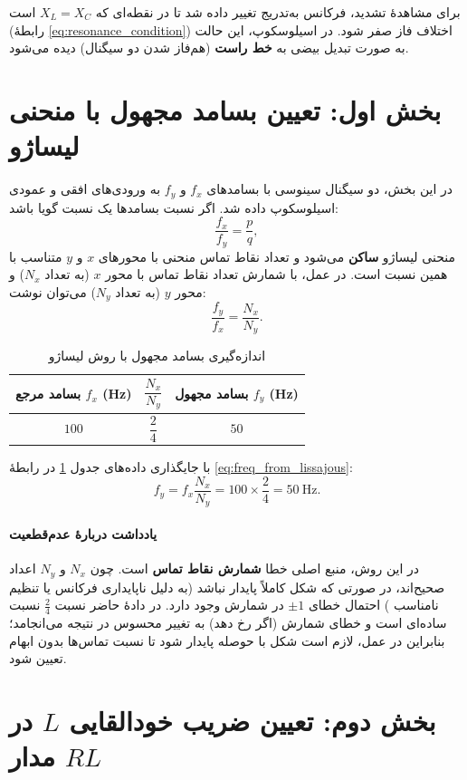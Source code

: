 \documentclass[a4paper, 11pt]{article}
\begin{document}
برای مشاهدهٔ تشدید، فرکانس به‌تدریج تغییر داده شد تا در نقطه‌ای که \(X_L=X_C\) است (رابطهٔ \eqref{eq:resonance_condition}) اختلاف فاز صفر شود. در اسیلوسکوپ، این حالت به صورت تبدیل بیضی به \textbf{خط راست} (هم‌فاز شدن دو سیگنال) دیده می‌شود.

\section{بخش اول: تعیین بسامد مجهول با منحنی لیساژو}

در این بخش، دو سیگنال سینوسی با بسامدهای \(f_x\) و \(f_y\) به ورودی‌های افقی و عمودی اسیلوسکوپ داده شد. اگر نسبت بسامدها یک نسبت گویا باشد:
\[
\frac{f_x}{f_y}=\frac{p}{q},
\]
منحنی لیساژو \textbf{ساکن} می‌شود و تعداد نقاط تماس منحنی با محورهای \(x\) و \(y\) متناسب با همین نسبت است. در عمل، با شمارش تعداد نقاط تماس با محور \(x\) (به تعداد \(N_x\)) و محور \(y\) (به تعداد \(N_y\)) می‌توان نوشت:
\begin{equation}
\frac{f_y}{f_x}=\frac{N_x}{N_y}.
\label{eq:freq_from_lissajous}
\end{equation}

\begin{table}[h!]
\caption{اندازه‌گیری بسامد مجهول با روش لیساژو}
\label{tab:freq_unknown}
\centering
\begin{tabular}{ccc}
\toprule
بسامد مرجع \(f_x\) (Hz) & \(\dfrac{N_x}{N_y}\) & بسامد مجهول \(f_y\) (Hz)\\
\midrule
$100$ & $\dfrac{2}{4}$ & $50$ \\
\bottomrule
\end{tabular}
\end{table}

با جایگذاری داده‌های جدول \ref{tab:freq_unknown} در رابطهٔ \eqref{eq:freq_from_lissajous}:
\[
f_y=f_x\frac{N_x}{N_y}=100\times\frac{2}{4}=50~\mathrm{Hz}.
\]

\paragraph{یادداشت دربارهٔ عدم‌قطعیت}
در این روش، منبع اصلی خطا \textbf{شمارش نقاط تماس} است. چون \(N_x\) و \(N_y\) اعداد صحیح‌اند، در صورتی که شکل کاملاً پایدار نباشد (به دلیل ناپایداری فرکانس یا تنظیم نامناسب ) احتمال خطای \(\pm 1\) در شمارش وجود دارد. در دادهٔ حاضر نسبت \(\frac{2}{4}\) نسبت ساده‌ای است و خطای شمارش (اگر رخ دهد) به تغییر محسوس در نتیجه می‌انجامد؛ بنابراین در عمل، لازم است شکل با حوصله پایدار شود تا نسبت تماس‌ها بدون ابهام تعیین شود.

\section{بخش دوم: تعیین ضریب خودالقایی $L$ در مدار $RL$}
\end{document}

